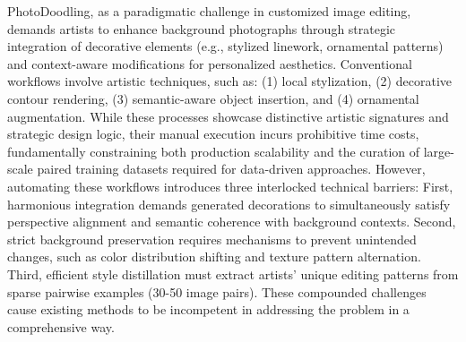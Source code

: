 PhotoDoodling, as a paradigmatic challenge in customized image editing, demands artists to enhance background photographs through strategic integration of decorative elements (e.g., stylized linework, ornamental patterns) and context-aware modifications for personalized aesthetics. Conventional workflows involve artistic techniques, such as: (1) local stylization, (2) decorative contour rendering, (3) semantic-aware object insertion, and (4) ornamental augmentation. While these processes showcase distinctive artistic signatures and strategic design logic, their manual execution incurs prohibitive time costs, fundamentally constraining both production scalability and the curation of large-scale paired training datasets required for data-driven approaches. However, automating these workflows introduces three interlocked technical barriers: First, harmonious integration demands generated decorations to simultaneously satisfy perspective alignment and semantic coherence with background contexts. Second, strict background preservation requires mechanisms to prevent unintended changes, such as color distribution shifting and texture pattern alternation. Third, efficient style distillation must extract artists' unique editing patterns from sparse pairwise examples (30-50 image pairs). These compounded challenges cause existing methods to be incompetent in addressing the problem in a comprehensive way.

